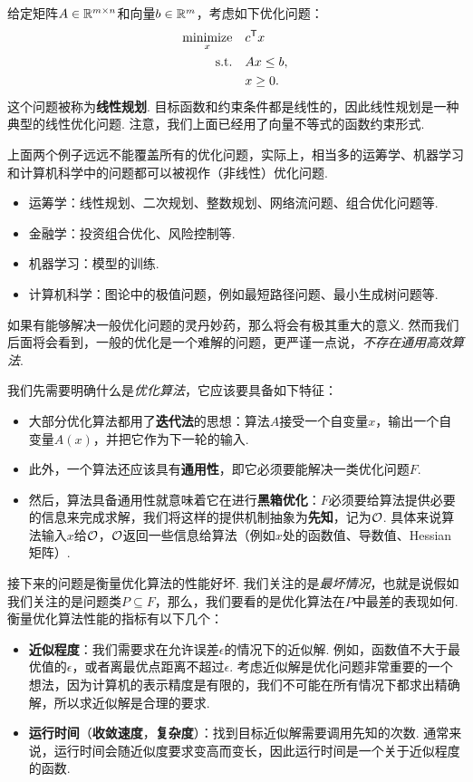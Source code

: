 \begin{example}[线性规划]\label{ex:linear-programming}
    给定矩阵$A\in\mathbb{R}^{m\times n}$和向量$b\in\mathbb{R}^m$，考虑如下优化问题：
    \begin{alignat*}{2}
    \operatorname*{minimize}_{x}&\quad c^{\mathsf{T}} x\\
    \text{s.t.}&\quad Ax\leq b,\\
    &\quad x\geq 0.
    \end{alignat*}
    这个问题被称为\textbf{线性规划}. 目标函数和约束条件都是线性的，因此线性规划是一种典型的线性优化问题. 注意，我们上面已经用了向量不等式的函数约束形式. 
\end{example}

上面两个例子远远不能覆盖所有的优化问题，实际上，相当多的运筹学、机器学习和计算机科学中的问题都可以被视作（非线性）优化问题. 
\begin{itemize}
    \item 运筹学：线性规划、二次规划、整数规划、网络流问题、组合优化问题等.
    \item 金融学：投资组合优化、风险控制等.
    \item 机器学习：模型的训练.
    \item 计算机科学：图论中的极值问题，例如最短路径问题、最小生成树问题等.
\end{itemize}

如果有能够解决一般优化问题的灵丹妙药，那么将会有极其重大的意义. 然而我们后面将会看到，一般的优化是一个难解的问题，更严谨一点说，\textit{不存在通用高效算法}. 

我们先需要明确什么是\textit{优化算法}，它应该要具备如下特征：
\begin{itemize}
    \item 大部分优化算法都用了\textbf{迭代法}的思想：算法$A$接受一个自变量$x$，输出一个自变量$A(x)$，并把它作为下一轮的输入.
    \item 此外，一个算法还应该具有\textbf{通用性}，即它必须要能解决一类优化问题$F$.
    \item 然后，算法具备通用性就意味着它在进行\textbf{黑箱优化}：$F$必须要给算法提供必要的信息来完成求解，我们将这样的提供机制抽象为\textbf{先知}，记为$\mathcal{O}$. 具体来说算法输入$x$给$\mathcal{O}$，$\mathcal{O}$返回一些信息给算法（例如$x$处的函数值、导数值、Hessian矩阵）.
\end{itemize}

接下来的问题是衡量优化算法的性能好坏. 我们关注的是\textit{最坏情况}，也就是说假如我们关注的是问题类$P\subseteq F$，那么，我们要看的是优化算法在$P$中最差的表现如何. 衡量优化算法性能的指标有以下几个：

\begin{itemize}
    \item \textbf{近似程度}：我们需要求在允许误差$\epsilon$的情况下的近似解. 例如，函数值不大于最优值的$\epsilon$，或者离最优点距离不超过$\epsilon$. 考虑近似解是优化问题非常重要的一个想法，因为计算机的表示精度是有限的，我们不可能在所有情况下都求出精确解，所以求近似解是合理的要求. 
    \item \textbf{运行时间}（\textbf{收敛速度}，\textbf{复杂度}）：找到目标近似解需要调用先知的次数. 通常来说，运行时间会随近似度要求变高而变长，因此运行时间是一个关于近似程度的函数.
\end{itemize}

